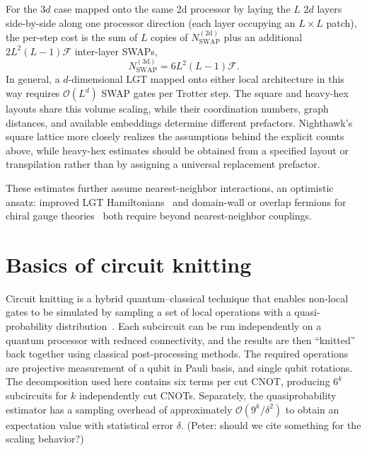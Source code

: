 \documentclass[twocolumn,superscriptaddress,showpacs,nofootinbib,notitlepage,preprintnumbers,secnumarabic,amssymb, floatfix, nobibnotes, aps, prd]{revtex4-2}
\begin{document}
For the $3d$ case mapped onto the same 2d processor by laying the $L$ $2d$ layers side-by-side along one processor direction (each layer occupying an $L\!\times\!L$ patch), the per-step cost is the sum of $L$ copies of $N_{\text{SWAP}}^{(2\text{d})}$ plus an additional $2L^{2}(L-1)\mathcal{F}$ inter-layer SWAPs, 
\begin{equation}
    N_{\text{SWAP}}^{(3\text{d})} = 6L^{2}(L-1)\mathcal{F}.
\end{equation}
In general, a $d$-dimensional LGT mapped onto either local architecture in this way requires $\mathcal{O}(L^d)$ SWAP gates per Trotter step.  
The square and heavy-hex layouts share this volume scaling, while their coordination numbers, graph distances, and available embeddings determine different prefactors.  
Nighthawk's square lattice more closely realizes the assumptions behind the explicit counts above, while heavy-hex estimates should be obtained from a specified layout or transpilation rather than by assigning a universal replacement prefactor.

These estimates further assume nearest-neighbor interactions, an optimistic ansatz: improved LGT Hamiltonians~\cite{Carena:2022kpg,Gustafson:2023aai,Ciavarella:2023mfc,Illa:2025dou,Illa:2025njz} and domain-wall or overlap fermions for chiral gauge theories~\cite{Clancy:2023kla,Singh:2025sye,Lamm:2026qsp} both require beyond nearest-neighbor couplings.


\section{Basics of circuit knitting}
\label{sec:knitting}
Circuit knitting is a hybrid quantum–classical technique that enables non-local gates to be simulated by sampling a set of local
operations with a quasi-probability distribution~\cite{PhysRevLett.125.150504,Mitarai:2019vae,Piveteau:2021jup,Mitarai:2021sud}. Each subcircuit can be run independently on a quantum processor with reduced connectivity, and the results are then “knitted” back together using classical post-processing methods. The required operations are projective measurement of a qubit in Pauli basis, and single qubit rotations. The decomposition used here contains six terms per cut CNOT, producing $6^k$ subcircuits for $k$ independently cut CNOTs. Separately, the quasiprobability estimator has a sampling overhead of approximately $\mathcal{O}(9^k/\delta^2)$ to obtain an expectation value with statistical error $\delta$. {\color{red}(Peter: should we cite something for the scaling behavior?)}
\end{document}
